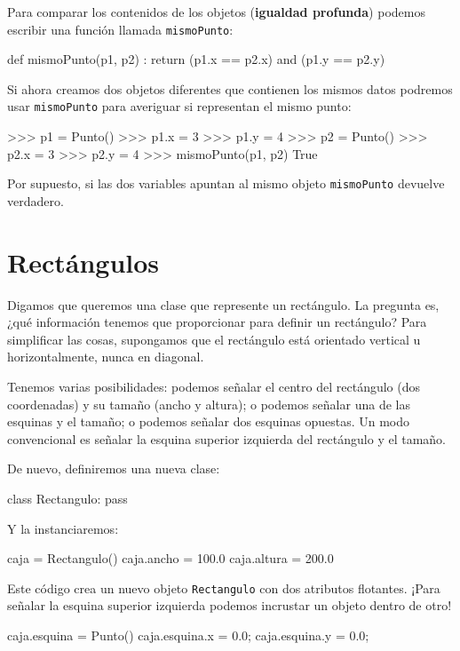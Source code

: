   

Para comparar los contenidos de los objetos (\textbf{igualdad profunda})
podemos escribir una función llamada \texttt{mismoPunto}:

\begin{pythoncode}
def mismoPunto(p1, p2) :
  return (p1.x == p2.x) and (p1.y == p2.y)
\end{pythoncode}
 Si ahora creamos dos objetos diferentes que contienen los mismos
datos podremos usar \texttt{mismoPunto} para averiguar si representan
el mismo punto:

\begin{pyconcode}
>>> p1 = Punto()
>>> p1.x = 3
>>> p1.y = 4
>>> p2 = Punto()
>>> p2.x = 3
>>> p2.y = 4
>>> mismoPunto(p1, p2)
True
\end{pyconcode}
 Por supuesto, si las dos variables apuntan al mismo objeto \texttt{mismoPunto}
devuelve verdadero.

\section{Rectángulos}

\label{embedded} 

Digamos que queremos una clase que represente un rectángulo. La pregunta
es, ¿qué información tenemos que proporcionar para definir un rectángulo?
Para simplificar las cosas, supongamos que el rectángulo está orientado
vertical u horizontalmente, nunca en diagonal.

Tenemos varias posibilidades: podemos señalar el centro del rectángulo
(dos coordenadas) y su tamaño (ancho y altura); o podemos señalar
una de las esquinas y el tamaño; o podemos señalar dos esquinas opuestas.
Un modo convencional es señalar la esquina superior izquierda del
rectángulo y el tamaño.

De nuevo, definiremos una nueva clase:
\begin{pythoncode}
class Rectangulo:	
  pass
\end{pythoncode}

Y la instanciaremos:
\begin{pythoncode}
caja = Rectangulo()
caja.ancho = 100.0
caja.altura = 200.0
\end{pythoncode}

Este código crea un nuevo objeto \texttt{Rectangulo} con dos atributos
flotantes. ¡Para señalar la esquina superior izquierda podemos incrustar
un objeto dentro de otro!
\begin{pythoncode}
caja.esquina = Punto()
caja.esquina.x = 0.0;
caja.esquina.y = 0.0;
\end{pythoncode}

